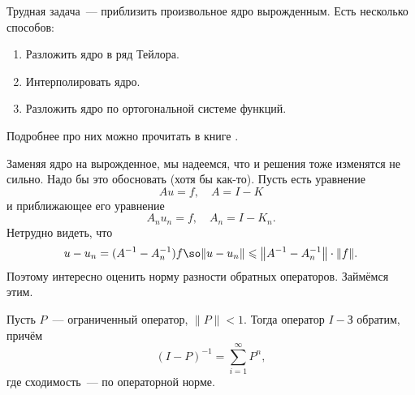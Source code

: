 \documentclass{trlnotes}
\begin{document}
    Трудная задача~--- приблизить произвольное ядро вырожденным. Есть несколько способов:

    \begin{enumerate}
        \item Разложить ядро в ряд Тейлора.
        \item Интерполировать ядро.
        \item Разложить ядро по ортогональной системе функций.
    \end{enumerate}


    Подробнее про них можно прочитать в книге \cite{comp-krilov-2}.

    Заменяя ядро на вырожденное, мы надеемся, что и решения тоже изменятся не сильно. Надо бы это обосновать (хотя бы как-то). Пусть есть уравнение
    \[
        Au = f, \quad A = I - K
    \]
    и приближающее его уравнение
    \[
        A_n u_n = f, \quad A_n = I - K_n. 
    \]
    Нетрудно видеть, что
    \[
        u - u_n = (A^{-1} - A_n^{-1})f \so \|u - u_n\| \leqslant \big\|A^{-1} - A_n^{-1}\big\| \cdot \|f\|.
    \]
    Поэтому интересно оценить норму разности обратных операторов. Займёмся этим.

    \begin{st}\label{st:close-zero-inv}
        Пусть $P$~--- ограниченный оператор, $\|P\| < 1$. Тогда оператор $I - З$ обратим, причём
        \[
            (I - P)^{-1} = \sum\limits_{i = 1}^{\infty} P^n,
        \]
        где сходимость~--- по операторной норме.
    \end{st}
\end{document}
